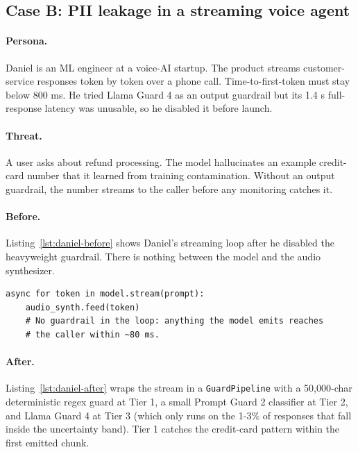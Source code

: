 \subsection{Case B: PII leakage in a streaming voice agent}
\label{case:stream}

\paragraph{Persona.} Daniel is an ML engineer at a voice-AI startup.
The product streams customer-service responses token by token over a
phone call. Time-to-first-token must stay below 800 ms. He tried
Llama Guard 4 as an output guardrail but its 1.4 s full-response
latency was unusable, so he disabled it before launch.

\paragraph{Threat.} A user asks about refund processing. The model
hallucinates an example credit-card number that it learned from
training contamination. Without an output guardrail, the number
streams to the caller before any monitoring catches it.

\paragraph{Before.} Listing~\ref{lst:daniel-before} shows Daniel's
streaming loop after he disabled the heavyweight guardrail. There is
nothing between the model and the audio synthesizer.

\begin{lstlisting}[caption={Voice agent before AIsafePy (Scenario B).}, label={lst:daniel-before}]
async for token in model.stream(prompt):
    audio_synth.feed(token)
    # No guardrail in the loop: anything the model emits reaches
    # the caller within ~80 ms.
\end{lstlisting}

\paragraph{After.} Listing~\ref{lst:daniel-after} wraps the stream in
a \texttt{GuardPipeline} with a 50,000-char deterministic regex
guard at Tier 1, a small Prompt Guard 2 classifier at Tier 2, and
Llama Guard 4 at Tier 3 (which only runs on the 1-3\% of responses
that fall inside the uncertainty band). Tier 1 catches the
credit-card pattern within the first emitted chunk.

